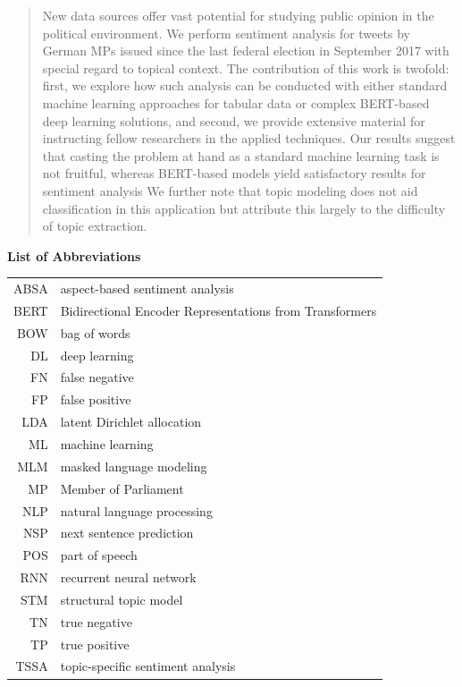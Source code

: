 \documentclass[12pt]{article}
\begin{document}

\newpage

\begin{abstract}

New data sources offer vast potential for studying public opinion in the 
political environment.
We perform sentiment analysis for tweets by German MPs issued since the last 
federal election in September 2017 with special regard to topical context.
The contribution of this work is twofold: first, we explore how such analysis 
can be conducted with either standard machine learning approaches for tabular 
data or complex BERT-based deep learning solutions, and second, we provide 
extensive material for instructing fellow researchers in the applied techniques.
Our results suggest that casting the problem at hand as a standard machine 
learning task is not fruitful, whereas BERT-based models yield satisfactory 
results for sentiment analysis
We further note that topic modeling does not aid classification in this 
application but attribute this largely to the difficulty of topic extraction.

\end{abstract}

\newpage

\tableofcontents
\newpage

\Large
\noindent
\textbf{List of Abbreviations}
\vspace{0.5cm} \\
\noindent
\normalsize

\begin{tabular}{rl}
  ABSA & aspect-based sentiment analysis \\
  BERT & Bidirectional Encoder Representations from Transformers \\ 
  BOW & bag of words \\
  DL & deep learning \\
  FN & false negative \\
  FP & false positive \\
  LDA & latent Dirichlet allocation \\
  ML & machine learning \\
  MLM & masked language modeling \\
  MP & Member of Parliament \\
  NLP & natural language processing \\
  NSP & next sentence prediction \\
  POS & part of speech \\
  RNN & recurrent neural network \\
  STM & structural topic model \\
  TN & true negative \\
  TP & true positive \\
  TSSA & topic-specific sentiment analysis
\end{tabular}
\end{document}
